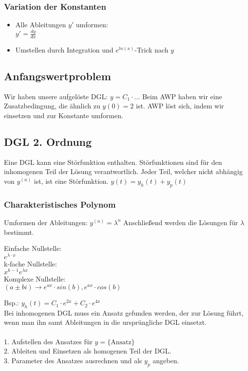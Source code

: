 \documentclass[a4paper, landscape, 10pt]{article}
\begin{document}
\begin{multicols}{5}
\begin{small}
			\subsubsection{Variation der Konstanten}
				\begin{itemize}
					\item Alle Ableitungen $y'$ umformen: \\
						  $y' = \frac{dy}{dx}$
					\item Umstellen durch Integration und $e^{ln(x)}$-Trick nach $y$
				\end{itemize}
			\subsection{Anfangswertproblem}
				Wir haben unsere aufgelöste DGL: $y = C_1 \cdot ...$
				Beim AWP haben wir eine Zusatzbedingung, die ähnlich zu $y(0) = 2$ ist. AWP löst sich, indem wir einsetzen und zur Konstante umformen.
		\subsection{DGL 2. Ordnung}	
			Eine DGL kann eine Störfunktion enthalten. Störfunktionen sind für den inhomogenen Teil der Lösung verantwortlich. Jeder Teil, welcher nicht abhängig von $y^{(n)}$ ist, ist eine Störfunktion. $y(t) = y_h(t) + y_p(t)$
			\subsubsection{Charakteristisches Polynom}
				Umformen der Ableitungen: $y^{(n)} = \lambda^n$
				Anschließend werden die Lösungen für $\lambda$ bestimmt.
				
					Einfache Nullstelle:\\
					$e^{\lambda \cdot x}$\\
					k-fache Nullstelle:\\
					$x^{k-1} e^{\lambda x}$\\
					Komplexe Nullstelle:\\
					$(a \pm bi) \rightarrow e^{ax} \cdot sin(b), e^{ax} \cdot cos(b)$
				
				Bsp.: $y_h(t) = C_1 \cdot e^{2x} + C_2 \cdot e^{4x}$\\
				Bei inhomogenen DGL muss ein Ansatz gefunden werden, der zur Lösung führt, wenn man ihn samt Ableitungen in die ursprüngliche DGL einsetzt.\\
				\\
				1. Aufstellen des Ansatzes für $y = \{ \text{Ansatz} \}$\\
				2. Ableiten und Einsetzen als homogenen Teil der DGL.\\
				3. Parameter des Ansatzes ausrechnen und als $y_p$ angeben.
\end{small}
\end{multicols}
\end{document}
